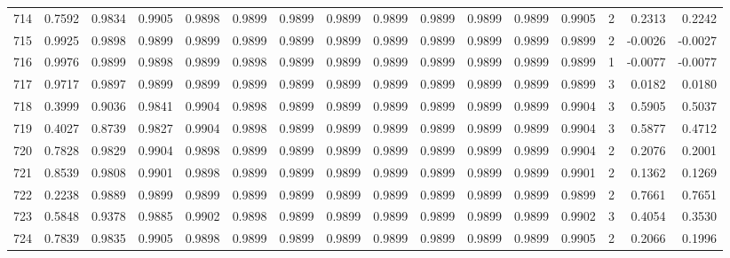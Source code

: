 \begin{tabular}{lrrrrrrrrrrrrrrr}
714 &      0.7592 &  0.9834 &  0.9905 &  0.9898 &  0.9899 &  0.9899 &  0.9899 &  0.9899 &  0.9899 &  0.9899 &   0.9899 &     0.9905 &      2 &                    0.2313 &                     0.2242 \\
715 &      0.9925 &  0.9898 &  0.9899 &  0.9899 &  0.9899 &  0.9899 &  0.9899 &  0.9899 &  0.9899 &  0.9899 &   0.9899 &     0.9899 &      2 &                   -0.0026 &                    -0.0027 \\
716 &      0.9976 &  0.9899 &  0.9898 &  0.9899 &  0.9898 &  0.9899 &  0.9899 &  0.9899 &  0.9899 &  0.9899 &   0.9899 &     0.9899 &      1 &                   -0.0077 &                    -0.0077 \\
717 &      0.9717 &  0.9897 &  0.9899 &  0.9899 &  0.9899 &  0.9899 &  0.9899 &  0.9899 &  0.9899 &  0.9899 &   0.9899 &     0.9899 &      3 &                    0.0182 &                     0.0180 \\
718 &      0.3999 &  0.9036 &  0.9841 &  0.9904 &  0.9898 &  0.9899 &  0.9899 &  0.9899 &  0.9899 &  0.9899 &   0.9899 &     0.9904 &      3 &                    0.5905 &                     0.5037 \\
719 &      0.4027 &  0.8739 &  0.9827 &  0.9904 &  0.9898 &  0.9899 &  0.9899 &  0.9899 &  0.9899 &  0.9899 &   0.9899 &     0.9904 &      3 &                    0.5877 &                     0.4712 \\
720 &      0.7828 &  0.9829 &  0.9904 &  0.9898 &  0.9899 &  0.9899 &  0.9899 &  0.9899 &  0.9899 &  0.9899 &   0.9899 &     0.9904 &      2 &                    0.2076 &                     0.2001 \\
721 &      0.8539 &  0.9808 &  0.9901 &  0.9898 &  0.9899 &  0.9899 &  0.9899 &  0.9899 &  0.9899 &  0.9899 &   0.9899 &     0.9901 &      2 &                    0.1362 &                     0.1269 \\
722 &      0.2238 &  0.9889 &  0.9899 &  0.9899 &  0.9899 &  0.9899 &  0.9899 &  0.9899 &  0.9899 &  0.9899 &   0.9899 &     0.9899 &      2 &                    0.7661 &                     0.7651 \\
723 &      0.5848 &  0.9378 &  0.9885 &  0.9902 &  0.9898 &  0.9899 &  0.9899 &  0.9899 &  0.9899 &  0.9899 &   0.9899 &     0.9902 &      3 &                    0.4054 &                     0.3530 \\
724 &      0.7839 &  0.9835 &  0.9905 &  0.9898 &  0.9899 &  0.9899 &  0.9899 &  0.9899 &  0.9899 &  0.9899 &   0.9899 &     0.9905 &      2 &                    0.2066 &                     0.1996 \\

\end{tabular}
